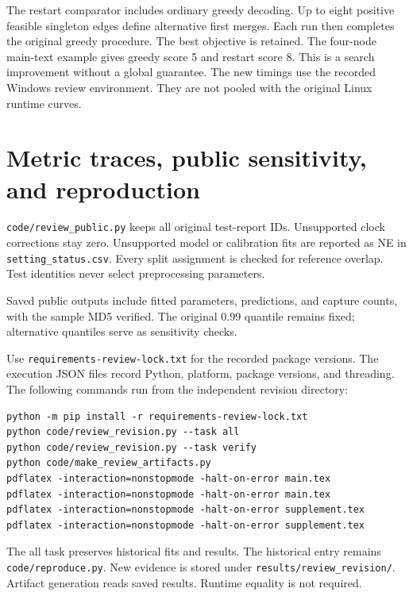 \documentclass[10pt,a4paper]{article}
\begin{document}
The restart comparator includes ordinary greedy decoding. Up to eight positive feasible singleton edges define alternative first merges. Each run then completes the original greedy procedure. The best objective is retained. The four-node main-text example gives greedy score 5 and restart score 8. This is a search improvement without a global guarantee. The new timings use the recorded Windows review environment. They are not pooled with the original Linux runtime curves.

\section{Metric traces, public sensitivity, and reproduction}
\begin{table}[!htb]\caption{Controlled factorial pair-count trace. Macro F1 averages scene scores before averaging replications. Micro F1 pools TP, FP, and FN. The two estimands differ.}\scriptsize\setlength{\tabcolsep}{3pt}\end{table}
\begin{table}[!htb]\caption{Public per-capture counts and feasibility for all original decoders. F1 uses reference-packet pairs. Rx and Gate are counts.}\scriptsize\setlength{\tabcolsep}{3pt}\end{table}

\texttt{code/review\_public.py} keeps all original test-report IDs. Unsupported clock corrections stay zero. Unsupported model or calibration fits are reported as NE in \texttt{setting\_status.csv}. Every split assignment is checked for reference overlap. Test identities never select preprocessing parameters.

Saved public outputs include fitted parameters, predictions, and capture counts, with the sample MD5 verified. The original 0.99 quantile remains fixed; alternative quantiles serve as sensitivity checks.

\noindent\begin{minipage}{\linewidth}
Use \texttt{requirements-review-lock.txt} for the recorded package versions. The execution JSON files record Python, platform, package versions, and threading. The following commands run from the independent revision directory:
\begin{verbatim}
python -m pip install -r requirements-review-lock.txt
python code/review_revision.py --task all
python code/review_revision.py --task verify
python code/make_review_artifacts.py
pdflatex -interaction=nonstopmode -halt-on-error main.tex
pdflatex -interaction=nonstopmode -halt-on-error main.tex
pdflatex -interaction=nonstopmode -halt-on-error supplement.tex
pdflatex -interaction=nonstopmode -halt-on-error supplement.tex
\end{verbatim}
\end{minipage}
The all task preserves historical fits and results. The historical entry remains \texttt{code/reproduce.py}. New evidence is stored under \texttt{results/review\_revision/}. Artifact generation reads saved results. Runtime equality is not required.
\end{document}
